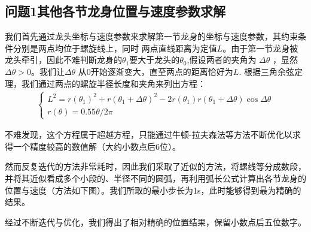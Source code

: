\documentclass[withoutpreface,bwprint]{cumcmthesis1} %
\begin{document}
\subsection{\textbf{问题1}其他各节龙身位置与速度参数求解}
我们首先通过龙头坐标与速度参数来求解第一节龙身的坐标与速度参数，其约束条件分别是两点均位于螺旋线上，同时
两点直线距离为定值$L$。由于第一节龙身被龙头牵引，因此不难判断龙身的$\theta_1$要大于龙头的$\theta_0$,假设两者的夹角为
$\Delta  \theta$ ，显然$\Delta  \theta >0$。我们让$\Delta  \theta$ 从0开始逐渐变大，直至两点的距离恰好为$L$.
根据三角余弦定理，我们通过两点的螺旋半径长度和夹角来列出方程：
\begin{align*}
    \begin{cases}
        L^2=r(\theta_1)^2+r(\theta_1+\Delta  \theta)^2-2r(\theta_1)r(\theta_1+\Delta  \theta) \cos \Delta \theta\\
        r(\theta)=0.55 \theta /2 \pi 
    \end{cases}
\end{align*}
\par
不难发现，这个方程属于超越方程，只能通过牛顿-拉夫森法等方法不断优化以求得一个精度较高的数值解（大约小数点后6位）。\par
然而反复迭代的方法非常耗时，因此我们采取了近似的方法，将螺线等分成数段，并将其近似看成多个小段的、半径不同的圆弧，再利用弧长公式计算出各节龙身的位置与速度（方法如下图）。我们所取的最小步长为1s，此时能够得到最为精确的结果。\par
经过不断迭代与优化，我们得出了相对精确的位置结果，保留小数点后五位数字。
\end{document}
